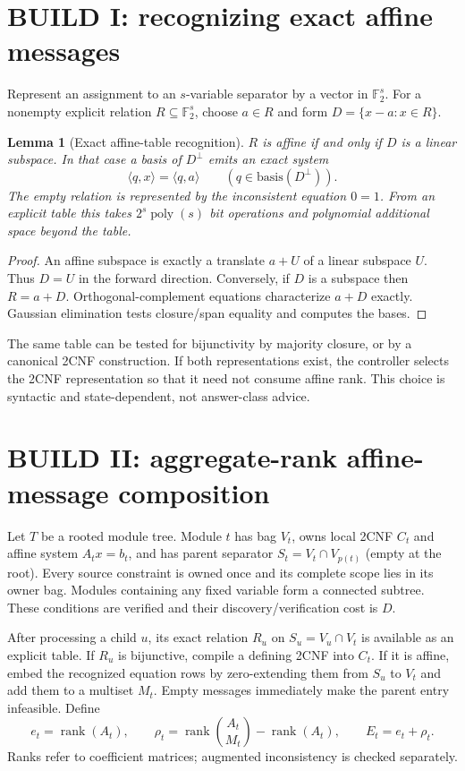 \documentclass[11pt]{article}
\newtheorem{lemma}[theorem]{Lemma}
\newcommand{\F}{\mathbb F_2}
\begin{document}
\section{BUILD I: recognizing exact affine messages}
Represent an assignment to an $s$-variable separator by a vector in
$\F^s$.  For a nonempty explicit relation $R\subseteq\F^s$, choose
$a\in R$ and form $D=\{x-a:x\in R\}$.

\begin{lemma}[Exact affine-table recognition]
$R$ is affine if and only if $D$ is a linear subspace.  In that case a basis
of $D^\perp$ emits an exact system
\[
  \langle q,x\rangle=\langle q,a\rangle
  \qquad(q\in\text{basis}(D^\perp)).
\]
The empty relation is represented by the inconsistent equation $0=1$.
From an explicit table this takes $2^s\operatorname{poly}(s)$ bit operations
and polynomial additional space beyond the table.
\end{lemma}
\begin{proof}
An affine subspace is exactly a translate $a+U$ of a linear subspace $U$.
Thus $D=U$ in the forward direction.  Conversely, if $D$ is a subspace then
$R=a+D$.  Orthogonal-complement equations characterize $a+D$ exactly.
Gaussian elimination tests closure/span equality and computes the bases.
\end{proof}

The same table can be tested for bijunctivity by majority closure, or by a
canonical 2CNF construction.  If both representations exist, the controller
selects the 2CNF representation so that it need not consume affine rank.  This
choice is syntactic and state-dependent, not answer-class advice.

\section{BUILD II: aggregate-rank affine-message composition}
Let $T$ be a rooted module tree.  Module $t$ has bag $V_t$, owns local 2CNF
$C_t$ and affine system $A_tx=b_t$, and has parent separator
$S_t=V_t\cap V_{p(t)}$ (empty at the root).  Every source constraint is owned
once and its complete scope lies in its owner bag.  Modules containing any
fixed variable form a connected subtree.  These conditions are verified and
their discovery/verification cost is $D$.

After processing a child $u$, its exact relation $R_u$ on
$S_u=V_u\cap V_t$ is available as an explicit table.  If $R_u$ is
bijunctive, compile a defining 2CNF into $C_t$.  If it is affine, embed the
recognized equation rows by zero-extending them from $S_u$ to $V_t$ and add
them to a multiset $M_t$.  Empty messages immediately make the parent entry
infeasible.  Define
\[
 e_t=\operatorname{rank}(A_t),\qquad
 \rho_t=\operatorname{rank}\!\binom{A_t}{M_t}-\operatorname{rank}(A_t),
 \qquad E_t=e_t+\rho_t.
\]
Ranks refer to coefficient matrices; augmented inconsistency is checked
separately.
\end{document}
